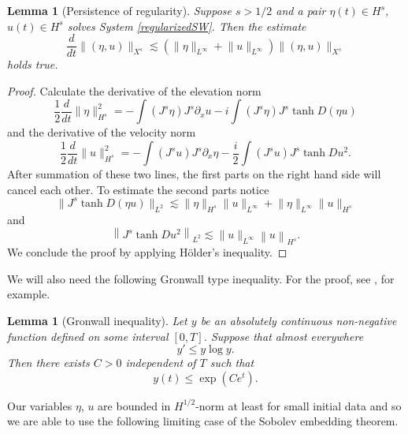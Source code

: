 \documentclass[reqno,12pt,a4paper]{article}
\theoremstyle{plain}
\newtheorem{lemma}[theorem]{\bf Lemma}
\begin{document}
\begin{lemma}
[Persistence of regularity]
\label{persistence_lemma}
	Suppose $s > 1/2$ and a pair
	$\eta(t) \in H^s$, $u(t) \in H^s$
	solves System \eqref{regularizedSW}.
	Then the estimate
	\[
		\frac{d}{dt} \lVert (\eta, u) \rVert _{X^s}
		\lesssim
		\left(
			\lVert \eta \rVert _{L^{\infty}}
			+ \lVert u \rVert _{L^{\infty}}
		\right)
		\lVert (\eta, u) \rVert _{X^s}
	\]
    holds true.
\end{lemma}


\begin{proof}
%
%
Calculate the derivative of the elevation norm
%
\begin{equation*}
	\frac 12 \frac{d}{dt} \lVert \eta \rVert _{H^s}^2
	=
	- \int \left( J^s \eta \right)
	J^s \partial_x u
	- i \int \left( J^s \eta \right)
	J^s \tanh D(\eta u)
\end{equation*}
%
%
and the derivative of the velocity norm
%
\begin{equation*}
	\frac 12 \frac{d}{dt} \lVert u \rVert _{H^s}^2
	=
	- \int \left( J^s u \right)
	J^s \partial_x \eta
	- \frac i2 \int \left( J^s u \right) J^s \tanh D u^2
	.
\end{equation*}
%
After summation of these two lines,
the first parts on the right hand side will cancel each other.
To estimate the second parts notice
%
\[
	\lVert J^s \tanh D(\eta u) \rVert _{L^2}
	\lesssim
	\lVert \eta \rVert _{H^s}
	\lVert u \rVert _{L^{\infty}}
	+
	\lVert \eta \rVert _{L^{\infty}}
	\lVert u \rVert _{H^s}
\]
%
and
%
\begin{equation*}
	\left \lVert J^s \tanh D u^2 \right \rVert _{L^2}
	\lesssim
	\lVert u \rVert _{L^{\infty}}
	\left \lVert u \right \rVert _{H^s}
	.
\end{equation*}
%
We conclude the proof by applying Hölder’s inequality.
%
%
\end{proof}


We will also need the following
Gronwall type inequality.
For the proof, see \cite{Dinvay2019}, for example.


\begin{lemma}
[Gronwall inequality]
	Let $y$ be an absolutely continuous non-negative
	function defined on some interval $[0, T]$.
	Suppose that almost everywhere
	\[
		y' \leqslant y \log y
		.
	\]
	Then there exists $C > 0$ independent of $T$
	such that
	\[
		y(t) \leqslant \exp \left( Ce^t \right)
		.
	\]
\end{lemma}


Our variables $\eta$, $u$ are bounded in
$H^{1/2}$-norm at least for small initial data and
so we are able to use
the following limiting case of the Sobolev embedding theorem.
\end{document}
